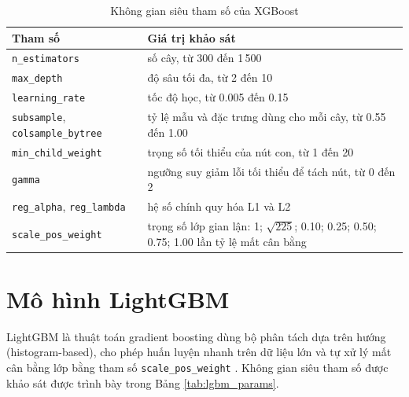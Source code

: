 \begin{table}[H]
\centering
\fontsize{11}{13.6}\selectfont
\renewcommand{\arraystretch}{1.2}
\setlength{\tabcolsep}{6pt}
\begin{tabularx}{\textwidth}{|p{4.8cm}|X|}
\hline
\textbf{Tham số} & \textbf{Giá trị khảo sát} \\
\hline
\texttt{n\_estimators} & số cây, từ 300 đến 1\,500 \\
\hline
\texttt{max\_depth} & độ sâu tối đa, từ 2 đến 10 \\
\hline
\texttt{learning\_rate} & tốc độ học, từ 0{.}005 đến 0{.}15 \\
\hline
\texttt{subsample}, \texttt{colsample\_bytree} & tỷ lệ mẫu và đặc trưng dùng cho mỗi cây, từ 0{.}55 đến 1{.}00 \\
\hline
\texttt{min\_child\_weight} & trọng số tối thiểu của nút con, từ 1 đến 20 \\
\hline
\texttt{gamma} & ngưỡng suy giảm lỗi tối thiểu để tách nút, từ 0 đến 2 \\
\hline
\texttt{reg\_alpha}, \texttt{reg\_lambda} & hệ số chính quy hóa L1 và L2 \\
\hline
\texttt{scale\_pos\_weight} & trọng số lớp gian lận: 1; $\sqrt{225}$; 0{.}10; 0{.}25; 0{.}50; 0{.}75; 1{.}00 lần tỷ lệ mất cân bằng \\
\hline
\end{tabularx}
\caption{Không gian siêu tham số của XGBoost}
\label{tab:xgb_params}
\end{table}

\section{Mô hình LightGBM}
LightGBM \cite{ke2017lightgbm} là thuật toán gradient boosting dùng bộ phân tách dựa trên hướng (histogram-based), cho phép huấn luyện nhanh trên dữ liệu lớn và tự xử lý mất cân bằng lớp bằng tham số \texttt{scale\_pos\_weight} \cite{lightgbmparameters}. Không gian siêu tham số được khảo sát được trình bày trong Bảng \ref{tab:lgbm_params}.

